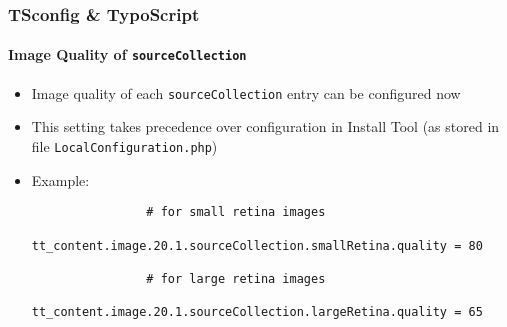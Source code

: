\begin{frame}[fragile]
	\frametitle{TSconfig \& TypoScript}
	\framesubtitle{Image Quality of \texttt{sourceCollection}}

	\lstset{basicstyle=\tiny\ttfamily}

	\begin{itemize}

		\item Image quality of each \texttt{sourceCollection} entry can be configured now

		\item This setting takes precedence over configuration in Install Tool\newline
			(as stored in file \texttt{LocalConfiguration.php})

		\item Example:

			\begin{lstlisting}
				# for small retina images
				tt_content.image.20.1.sourceCollection.smallRetina.quality = 80

				# for large retina images
				tt_content.image.20.1.sourceCollection.largeRetina.quality = 65
			\end{lstlisting}

	\end{itemize}

\end{frame}


